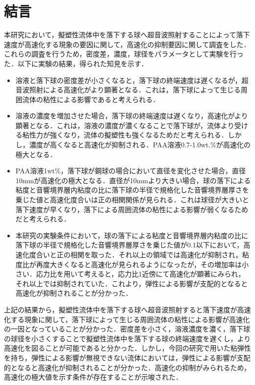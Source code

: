 \section{結言}
本研究において，擬塑性流体中を落下する球へ超音波照射することによって落下速度が高速化する現象の要因に関して，高速化の抑制要因に関して調査をした．これらの調査を行うため，密度差，濃度，球径をパラメータとして実験を行った．以下に実験の結果，得られた知見を示す．

\begin{itemize}
    \item 溶液と落下球の密度差が小さくなると，落下球の終端速度は遅くなるが，超音波照射による高速化がより顕著となる．これは，落下球によって生じる周囲流体の粘性による影響であると考えられる．
    \item 溶液の濃度を増加させた場合，落下球の終端速度は遅くなり，高速化がより顕著となる．これは，溶液の濃度が濃くなることで落下球が，流体より受ける粘性力が強くなり，流体の擬塑性も強くなるためだと考えられる．しかし，濃度が高くなると高速化が抑制される．PAA溶液0.7-1.0wt.\%が高速化の極大となる．
    \item PAA溶液1wt\%，落下球が鋼球の場合において直径を変化させた場合，直径10mmが高速化の極大となる．直径が10mmより大きい場合，球の落下による粘度と音響境界層内粘度の比に落下球の半径で規格化した音響境界層厚さを乗じた値と高速化度合いは正の相関関係が見られる．これは球径が大きいと落下速度が早くなり，落下による周囲流体の粘性による影響が弱くなるためだと考えられる．
    \item 本研究の実験条件において，球の落下による粘度と音響境界層内粘度の比に落下球の半径で規格化した音響境界層厚さを乗じた値が0.1以下において，高速化度合いと正の相関を取った．それ以上の領域では高速化が抑制され，粘度比が再度大きくなると高速化が見られるようになったが，その増加率は小さい．応力比を用いて考えると，応力比1近傍にて高速化が顕著にみられ，それ以上では抑制されていた．これより，弾性による影響が支配的となると高速化が抑制されることが分かった．
\end{itemize}

上記の結果から，擬塑性流体中を落下する球へ超音波照射すると落下速度が高速化する現象に関して，落下球によって生じる周囲流体の粘性による影響が高速化の一因となっていることが分かった．密度差を小さく，溶液濃度を濃く，落下球の球径を小さくすることで擬塑性流体中を落下する球の終端速度を遅くし，より高速化を図ることが可能であると分かった．しかし，今回の研究で用いた粘弾性を持ち，弾性による影響が無視できない流体においては，弾性による影響が支配的となると高速化が抑制されることが分かった．高速化の抑制がみられるため，高速化の極大値を示す条件が存在することが示唆された．
